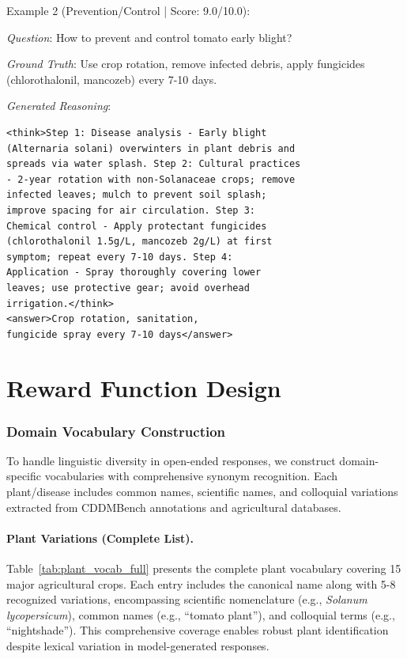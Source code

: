 \documentclass[11pt]{article}
\begin{document}
\noindent Example 2 (Prevention/Control | Score: 9.0/10.0):

\noindent\textit{Question}: How to prevent and control tomato early blight?

\noindent\textit{Ground Truth}: Use crop rotation, remove infected debris, apply fungicides (chlorothalonil, mancozeb) every 7-10 days.

\noindent\textit{Generated Reasoning}:

\vspace{2pt}
\begin{footnotesize}
\begin{verbatim}
<think>Step 1: Disease analysis - Early blight
(Alternaria solani) overwinters in plant debris and
spreads via water splash. Step 2: Cultural practices
- 2-year rotation with non-Solanaceae crops; remove
infected leaves; mulch to prevent soil splash;
improve spacing for air circulation. Step 3:
Chemical control - Apply protectant fungicides
(chlorothalonil 1.5g/L, mancozeb 2g/L) at first
symptom; repeat every 7-10 days. Step 4:
Application - Spray thoroughly covering lower
leaves; use protective gear; avoid overhead
irrigation.</think>
<answer>Crop rotation, sanitation,
fungicide spray every 7-10 days</answer>
\end{verbatim}
\end{footnotesize}
\vspace{2pt}

\section{Reward Function Design}
\label{sec:appendix_reward}

\subsubsection{Domain Vocabulary Construction}
\label{sec:appendix_vocabulary}

To handle linguistic diversity in open-ended responses, we construct domain-specific vocabularies with comprehensive synonym recognition. Each plant/disease includes common names, scientific names, and colloquial variations extracted from CDDMBench annotations and agricultural databases.

\paragraph{Plant Variations (Complete List).}

Table~\ref{tab:plant_vocab_full} presents the complete plant vocabulary covering 15 major agricultural crops. Each entry includes the canonical name along with 5-8 recognized variations, encompassing scientific nomenclature (e.g., \emph{Solanum lycopersicum}), common names (e.g., ``tomato plant''), and colloquial terms (e.g., ``nightshade''). This comprehensive coverage enables robust plant identification despite lexical variation in model-generated responses.
\end{document}
